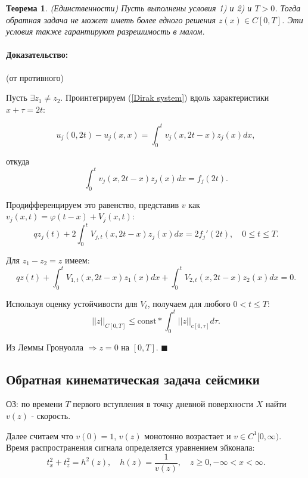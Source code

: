 \documentclass{article}
\newtheorem{theorem}{Теорема}
\newenvironment{proof}{\paragraph{Доказательство:}}{\hfill$\blacksquare$}
\begin{document}
\begin{theorem}
	(Единственности)
	Пусть выполнены условия 1) и 2) и $T>0$. Тогда обратная задача не может иметь более едного решения $z(x) \in C[0,T]$. Эти условия также гарантируют разрешимость в малом.
\end{theorem}
\begin{proof}
	(от противного)
	
	Пусть $\exists z_1 \neq z_2$. Проинтегрируем (\ref{Dirak system}) вдоль характеристики $x + \tau = 2t$:
	

\begin{equation*}
	u_j(0,2t) - u_j(x,x) = \int_0^t v_j(x,2t-x) z_j(x) dx,
\end{equation*}

откуда
\begin{equation*}
	\int_0^t v_j(x,2t-x)z_j(x) dx = f_j(2t).
\end{equation*}

Продифференцируем это равенство, представив $v$ как $v_j(x,t) = \varphi(t-x) + V_j(x,t)$:
\begin{equation*}
	qz_j(t) + 2 \int_0^t V_{j,t}(x,2t-x) z_j(x) dx = 2f_j'(2t), \quad 0 \leqslant t \leqslant T.
\end{equation*}

Для $z_1-z_2 = z$ имеем:
\begin{equation*}
	qz(t) + \int_0^t V_{1,t} (x,2t-x) z_1(x) dx + \int_0^t V_{2,t}(x,2t-x) z_2(x) dx = 0.
\end{equation*}

Используя оценку устойчивости для $V_t$, получаем для любого $0 < t \leqslant T$:
\begin{equation*}
	||z||_{C[0,T]} \leqslant \text{const} * \int_0^t ||z||_{c[0,\tau]} d\tau.
\end{equation*}

Из Леммы Гронуолла $\Rightarrow z = 0$ на $[0,T]$.
\end{proof}

\subsection*{Обратная кинематическая задача сейсмики}


ОЗ: по времени $T$ первого вступления в точку дневной поверхности $X$ найти $v(z) $ - скорость.

Далее считаем что $v(0) = 1$, $v(z)$ монотонно возрастает и $v \in C^1[0,\infty)$.
Время распространения сигнала определяется уравнением эйконала:
\begin{equation*}
	t_x^2 + t_z^2 = h^2(z), \quad h(z) = \dfrac{1}{v(z)}, \quad z \geqslant 0, -\infty < x < \infty.
\end{equation*}
\end{document}
